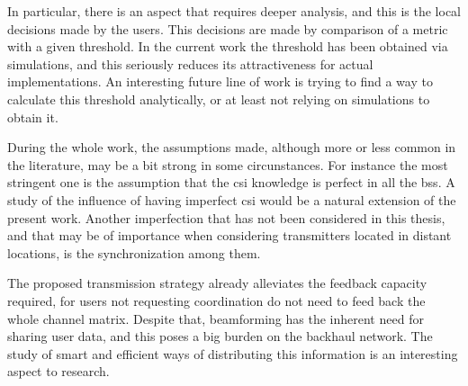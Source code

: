 In particular, there is an aspect that requires deeper analysis, and this is the
local decisions made by the users. This decisions are made by comparison of a
metric with a given threshold. In the current work the threshold has been
obtained via simulations, and this seriously reduces its attractiveness for
actual implementations. An interesting future line of work is trying to find a
way to calculate this threshold analytically, or at least not relying on
simulations to obtain it.

During the whole work, the assumptions made, although more or less common in the
literature, may be a bit strong in some circunstances. For instance the most
stringent one is the assumption that the \gls{csi} knowledge is perfect in all
the \glspl{bs}. A study of the influence of having imperfect \gls{csi} would be
a natural extension of the present work. Another imperfection that has not been
considered in this thesis, and that may be of importance when considering
transmitters located in distant locations, is the synchronization among them.

The proposed transmission strategy already alleviates the feedback capacity
required, for users not requesting coordination do not need to feed back the
whole channel matrix. Despite that, beamforming has the inherent need for
sharing user data, and this poses a big burden on the backhaul network. The
study of smart and efficient ways of distributing this information is an
interesting aspect to research.
